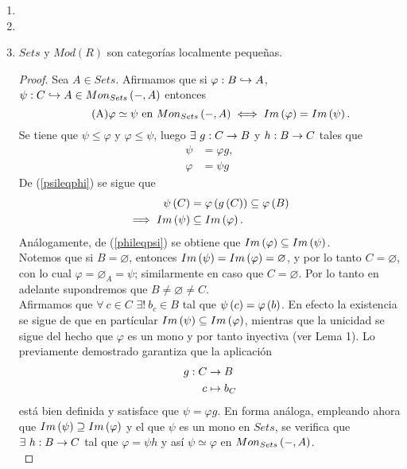 \documentclass{article}
\begin{document}
\begin{enumerate}[label=\textbf{Ej \arabic*.}]
\begin{proof}
		\end{proof}
		\item
		\item
		\item $Sets$ y $Mod(R)$ son categorías localmente pequeñas.
		\begin{proof}
			Sea $A\in Sets$. Afirmamos que si $\catarrow{\varphi}{B}{A}{m}$, $\catarrow{\psi}{C}{A}{m}\in\moncategory{Sets}{A}$ entonces
			\begin{equation*}\tag{A}\label{clasesIm}
				\varphi\simeq\psi \text{ en }Mon_{Sets}\left(-,A\right)\iff Im\left(\varphi\right)=Im\left(\psi\right).
			\end{equation*}
			\boxed{\implies} Se tiene que $\psi\leq\varphi$ y $\varphi\leq \psi$, luego $\exists\ \catarrow{g}{C}{B}{}$ y $\catarrow{h}{B}{C}{}$ tales que \begin{align*}
				\psi&=\varphi g,\tag{*}\label{psileqphi}\\
				\varphi&=\psi g\tag{**}\label{phileqpsi}
			\end{align*}
			De (\ref{psileqphi}) se sigue que
			\begin{align*}
				\psi\left(C\right)&=\varphi\left(g\left(C\right)\right)\subseteq\varphi\left(B\right)\\
				\implies Im\left(\psi\right)&\subseteq Im\left(\varphi\right).
			\end{align*}
			Análogamente, de (\ref{phileqpsi}) se obtiene que $Im\left(\varphi\right)\subseteq Im\left(\psi\right)$.\\
			\boxed{\impliedby} Notemos que si $B=\varnothing$, entonces
			$Im\left(\psi\right)=Im\left(\varphi\right)=\varnothing$, y por lo tanto $C=\varnothing$, con lo cual $\varphi=\varnothing_{A}=\psi$; similarmente en caso que $C=\varnothing$. Por lo tanto en adelante supondremos que $B\neq\varnothing\neq C$. \\
			Afirmamos que $\forall \ c\in C$ $\exists !\ b_c\in B$ tal que $\psi\left(c\right)=\varphi\left(b\right)$. En efecto la existencia se sigue de que en partícular $Im\left(\psi\right)\subseteq Im\left(\varphi\right)$, mientras que la unicidad se sigue del hecho que $\varphi$ es un mono y por tanto inyectiva (ver Lema 1). Lo previamente demostrado garantiza que la aplicación
			\begin{align*}
				g: C &\rightarrow B\\ c &\mapsto b_C
			\end{align*}
			está bien definida y satisface que $\psi=\varphi g$. En forma análoga, empleando ahora que $Im\left(\psi\right)\supseteq Im\left(\varphi\right)$ y el que $\psi$ es un mono en $Sets$, se verifica que $\exists\ \catarrow{h}{B}{C}{}$ tal que $\varphi=\psi h$ y así $\psi\simeq\varphi$ en $Mon_{Sets}\left(-,A\right)$.\\

\end{proof}
\end{enumerate}
\end{document}
